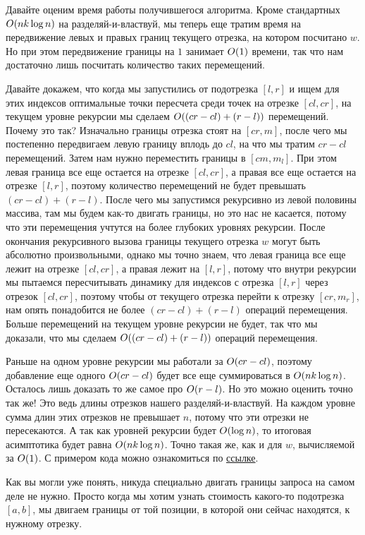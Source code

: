 Давайте оценим время работы получившегося алгоритма. Кроме стандартных $O(n k \log n)$ на разделяй-и-властвуй, мы теперь еще тратим время на передвижение левых и правых границ текущего отрезка, на котором посчитано $w$. Но при этом передвижение границы на $1$ занимает $O(1)$ времени, так что нам достаточно лишь посчитать количество таких перемещений.

Давайте докажем, что когда мы запустились от подотрезка $[l, r]$ и ищем для этих индексов оптимальные точки пересчета среди точек на отрезке $[cl, cr]$, на текущем уровне рекурсии мы сделаем $O((cr - cl) + (r - l))$ перемещений. Почему это так? Изначально границы отрезка стоят на $[cr, m]$, после чего мы постепенно передвигаем левую границу вплодь до $cl$, на что мы тратим $cr - cl$ перемещений. Затем нам нужно переместить границы в $[cm, m_l]$. При этом левая граница все еще остается на отрезке $[cl, cr]$, а правая все еще остается на отрезке $[l, r]$, поэтому количество перемещений не будет превышать $(cr - cl) + (r - l)$. После чего мы запустимся рекурсивно из левой половины массива, там мы будем как-то двигать границы, но это нас не касается, потому что эти перемещения учтутся на более глубоких уровнях рекурсии. После окончания рекурсивного вызова границы текущего отрезка $w$ могут быть абсолютно произвольными, однако мы точно знаем, что левая граница все еще лежит на отрезке $[cl, cr]$, а правая лежит на $[l, r]$, потому что внутри рекурсии мы пытаемся пересчитывать динамику для индексов с отрезка $[l, r]$ через отрезок $[cl, cr]$, поэтому чтобы от текущего отрезка перейти к отрезку $[cr, m_r]$, нам опять понадобится не более $(cr - cl) + (r - l)$ операций перемещения. Больше перемещений на текущем уровне рекурсии не будет, так что мы доказали, что мы сделаем $O((cr - cl) + (r - l))$ операций перемещения.

Раньше на одном уровне рекурсии мы работали за $O(cr - cl)$, поэтому добавление еще одного $O(cr - cl)$ будет все еще суммироваться в $O(n k \log n)$. Осталось лишь доказать то же самое про $O(r - l)$. Но это можно оценить точно так же! Это ведь длины отрезков нашего разделяй-и-властвуй. На каждом уровне сумма длин этих отрезков не превышает $n$, потому что эти отрезки не пересекаются. А так как уровней рекурсии будет $O(\log n)$, то итоговая асимптотика будет равна $O(n k \log n)$. Точно такая же, как и для $w$, вычисляемой за $O(1)$. С примером кода можно ознакомиться по \href{https://codeforces.com/contest/868/submission/136528300}{ссылке}.

\begin{observation}
    Как вы могли уже понять, никуда специально двигать границы запроса на самом деле не нужно. Просто когда мы хотим узнать стоимость какого-то подотрезка $[a, b]$, мы двигаем границы от той позиции, в которой они сейчас находятся, к нужному отрезку.
\end{observation}

